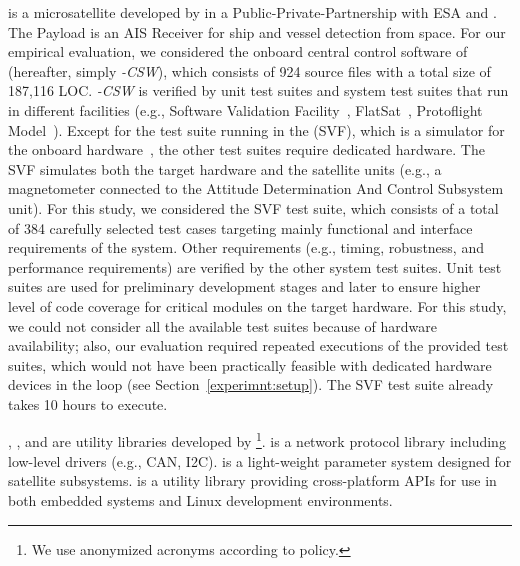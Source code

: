 \emph{\SAIL{}} is a microsatellite developed by \TWO{}  in a Public-Private-Partnership with ESA and \ExaE{}. The Payload is an AIS Receiver for ship and vessel detection from space.
For our empirical evaluation, we considered the onboard central control software of \SAIL{} (hereafter, simply \SAIL{}\emph{-CSW}), which consists of 924 source files with a total size of 187,116 LOC.
\SAIL{}\emph{-CSW} is verified by unit test suites and system test suites that run in different facilities (e.g., Software Validation Facility~\cite{Isasi2019}, FlatSat~\cite{Eickhoff:Simulate}, Protoflight Model~\cite{ecssHB10A}).
Except for the test suite running in the  (SVF), which is a simulator for the onboard hardware~\cite{Isasi2019}, the other test suites require dedicated hardware.
The SVF simulates both the target hardware and the satellite units (e.g., a magnetometer connected to the Attitude Determination And Control Subsystem unit).
For this study, we considered the SVF test suite, which
consists of a total of 384 carefully selected test cases targeting mainly functional and interface requirements of the system.
Other requirements (e.g., timing, robustness, and performance requirements) are verified by the other system test suites.
Unit test suites are used for preliminary development stages and later to ensure
higher level of code coverage for critical modules on the target hardware.
For this study, we could not consider all the available test suites because of hardware availability; also, our evaluation required repeated executions of the provided test suites, which would not have been practically feasible with dedicated hardware devices in the loop (see Section~\ref{experimnt:setup}).
The SVF test suite already takes 10 hours to execute.


\GCSP{}, \PARAM{}, and \UTIL{}  are utility libraries developed by \ONE\footnote{We use anonymized acronyms according to \ONE policy.}.
\emph{\GCSP{}} is a network protocol library including low-level drivers (e.g., CAN, I2C).
{\PARAM{}} is a light-weight parameter system designed for \ONE satellite subsystems.
{\UTIL{}} is a utility library providing cross-platform APIs for use in both embedded systems and Linux development environments.

